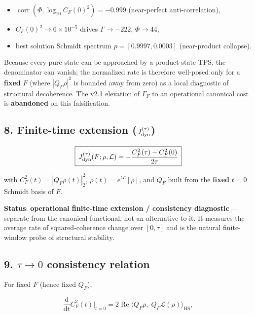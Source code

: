 \documentclass[
]{article}
\providecommand{\tightlist}{%
  \setlength{\itemsep}{0pt}\setlength{\parskip}{0pt}}
\begin{document}
\begin{itemize}
\tightlist
\item
  \(\operatorname{corr}(\Phi, \log_{10} C_F(0)^2) = -0.999\)
  (near-perfect anti-correlation),
\item
  \(C_F(0)^2 \to 6\times10^{-5}\) drives \(\Gamma \to -222\),
  \(\Phi \to 44\),
\item
  best solution Schmidt spectrum \(p = [0.9997, 0.0003]\) (near-product
  collapse).
\end{itemize}

Because every pure state can be approached by a product-state TPS, the
denominator can vanish; the normalized rate is therefore well-posed only
for a \textbf{fixed} \(F\) (where \(|Q_F\rho|^2\) is bounded away from
zero) as a local diagnostic of structural decoherence. The v2.1
elevation of \(\Gamma_F\) to an operational canonical cost is
\textbf{abandoned} on this falsification.

\subsection{\texorpdfstring{8. Finite-time extension
(\(J_{\rm dyn}^{(\tau)}\))}{8. Finite-time extension (J\_\{\textbackslash rm dyn\}\^{}\{(\textbackslash tau)\})}}\label{finite-time-extension-j_rm-dyntau}

\[
\boxed{\,
J_{\rm dyn}^{(\tau)}(F;\rho,\mathcal L)
= -\frac{C_F^2(\tau) - C_F^2(0)}{2\tau}
\,}
\]

with \(C_F^2(t) = |Q_F \rho(t)|_2^2\),
\(\rho(t) = e^{t\mathcal L}[\rho]\), and \(Q_F\) built from the
\textbf{fixed} \(t=0\) Schmidt basis of \(F\).

\textbf{Status}: \textbf{operational finite-time extension / consistency
diagnostic} --- separate from the canonical functional, not an
alternative to it. It measures the average rate of squared-coherence
change over \([0,\tau]\) and is the natural finite-window probe of
structural stability.

\subsection{\texorpdfstring{9. \(\tau\to0\) consistency
relation}{9. \textbackslash tau\textbackslash to0 consistency relation}}\label{tauto0-consistency-relation}

For fixed \(F\) (hence fixed \(Q_F\)),

\[
\frac{\mathrm{d}}{\mathrm{d}t} C_F^2(t)\bigg|_{t=0}
= 2\operatorname{Re}\langle Q_F\rho,\; Q_F\mathcal L(\rho)\rangle_{\mathrm{HS}},
\]
\end{document}
